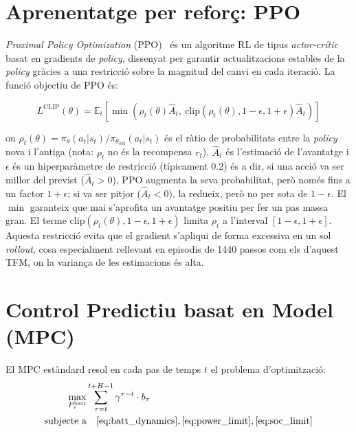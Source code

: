 \documentclass[a4paper,12pt,twoside]{ThesisStyle}
\begin{document}
\section{Aprenentatge per reforç: PPO}

\textit{Proximal Policy Optimization} (PPO)~\cite{schulman2017ppo} és un algoritme RL de tipus \textit{actor-crític} basat en gradients de \textit{policy}, dissenyat per garantir actualitzacions estables de la \textit{policy} gràcies a una restricció sobre la magnitud del canvi en cada iteració. La funció objectiu de PPO és:

\begin{equation}
    L^{\mathrm{CLIP}}(\theta) = \mathbb{E}_t \left[ \min \left( \rho_t(\theta) \hat{A}_t,\ \mathrm{clip}(\rho_t(\theta), 1-\epsilon, 1+\epsilon) \hat{A}_t \right) \right]
    \label{eq:ppo}
\end{equation}

on $\rho_t(\theta) = \pi_\theta(a_t|s_t) / \pi_{\theta_{\mathrm{old}}}(a_t|s_t)$ és el ràtio de probabilitats entre la \textit{policy} nova i l'antiga (nota: $\rho_t$ no és la recompensa $r_t$), $\hat{A}_t$ és l'estimació de l'avantatge i $\epsilon$ és un hiperparàmetre de restricció (típicament 0.2) és a dir, si una acció va ser millor del previst ($\hat{A}_t > 0$), PPO augmenta la seva probabilitat, però només fins a un factor $1+\epsilon$; si va ser pitjor ($\hat{A}_t < 0$), la redueix, però no per sota de $1-\epsilon$. El $\min$ garanteix que mai s'aprofita un avantatge positiu per fer un pas massa gran. El terme $\mathrm{clip}(\rho_t(\theta), 1-\epsilon, 1+\epsilon)$ limita $\rho_t$ a l'interval $[1-\epsilon, 1+\epsilon]$. Aquesta restricció evita que el gradient s'apliqui de forma excessiva en un sol \textit{rollout}, cosa especialment rellevant en episodis de 1440 passos com els d'aquest TFM, on la variança de les estimacions és alta.

\section{Control Predictiu basat en Model (MPC)}

El MPC estàndard resol en cada pas de temps $t$ el problema d'optimització:
\begin{align}
    \max_{P_\tau^{\mathrm{batt}}} & \sum_{\tau=t}^{t+H-1} \gamma^{\tau-t} \cdot b_\tau \label{eq:mpc_obj} \\
    \text{subjecte a} & \quad \eqref{eq:batt_dynamics}, \eqref{eq:power_limit}, \eqref{eq:soc_limit} \nonumber
\end{align}
\end{document}
